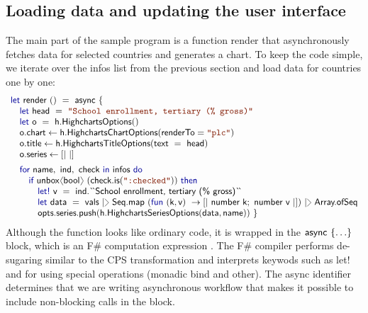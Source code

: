 \documentclass[submission,copyright,creativecommons]{eptcs}
\newcommand{\langl}{\begin{picture}(4.5,7)
\put(1.1,2.5){\rotatebox{60}{\line(1,0){5.5}}}
\put(1.1,2.5){\rotatebox{300}{\line(1,0){5.5}}}
\end{picture}}
\newcommand{\rangl}{\begin{picture}(4.5,7)
\put(.9,2.5){\rotatebox{120}{\line(1,0){5.5}}}
\put(.9,2.5){\rotatebox{240}{\line(1,0){5.5}}}
\end{picture}}
\newcommand{\rang}{\begin{picture}(5,7)
\put(.1,2.5){\rotatebox{135}{\line(1,0){6.0}}}
\put(.1,2.5){\rotatebox{225}{\line(1,0){6.0}}}
\end{picture}}
\newcommand{\kvd}[1]{\textnormal{\textcolor{kvdclr}{\sffamily #1}}}
\newcommand{\str}[1]{\textnormal{\textcolor{strclr}{\ttfamily "#1"}}}
\newcommand{\ident}[1]{\textnormal{\sffamily #1}}
\newcommand{\lident}[1]{\textnormal{\sffamily 
  \`{}\hspace{-0.25em}\`{}\hspace{-0.1em}#1\`{}\hspace{-0.25em}\`{}}}
\begin{document}

\subsection{Loading data and updating the user interface}
\label{sec:case-loading}

The main part of the sample program is a function \ident{render} that asynchronously fetches 
data for selected countries and generates a chart. To keep the code simple, we iterate over the 
\ident{infos} list from the previous section and load data for countries one by one:
%
\begin{equation*}
\begin{array}{lll}
 \kvd{let}~\ident{render}~()~=~\ident{async}~\{ \\
 \quad \kvd{let}~\ident{head}~=~\str{School enrollment, tertiary (\% gross)} \\
 \quad \kvd{let}~\ident{o}~=~\ident{h.HighchartsOptions}() \\
 \quad \ident{o.chart} \leftarrow \ident{h.HighchartsChartOptions}(\ident{renderTo}=\str{plc}) \\
 \quad \ident{o.title} \leftarrow \ident{h.HighchartsTitleOptions}(\ident{text}~=~\ident{head}) \\
 \quad \ident{o.series} \leftarrow \lbrack| ~ |\rbrack
 \\[0.5em]   
 \quad \kvd{for}~\ident{name},~\ident{ind},~\ident{check}~\kvd{in}~\ident{infos}~\kvd{do}\\
 \qquad   \kvd{if}~\ident{unbox}\langl \ident{bool} \rangl~(\ident{check.is}(\str{:checked}))~\kvd{then} \\
 \qquad\quad     \kvd{let!}~\ident{v}~=~\ident{ind.}\lident{School enrollment, tertiary (\% gross)} \\
 \qquad\quad     \kvd{let}~\ident{data}~=~\ident{vals}~
                   |\rang~\ident{Seq.map}~(\kvd{fun}~(\ident{k}, \ident{v})~\rightarrow \lbrack|~\ident{number~k};~\ident{number~v} ~|\rbrack)~
                   |\rang~\ident{Array.ofSeq} \\
 \qquad\quad     \ident{opts.series.push}(\ident{h.HighchartsSeriesOptions}(\ident{data}, \ident{name})) ~\}
\end{array}
\end{equation*}
%
Although the function looks like ordinary code, it is wrapped in the $\ident{async}~\{\ldots\}$ 
block, which is an F\# computation expression \cite{fsharp-zoo}. The F\# compiler performs 
de-sugaring similar to the CPS transformation and interprets keywods such as \kvd{let!} and 
\kvd{for} using special operations (monadic bind and other). The \ident{async} identifier 
determines that we are writing asynchronous workflow \cite{fsharp-async} that makes it 
possible to include non-blocking calls in the block.
\end{document}

